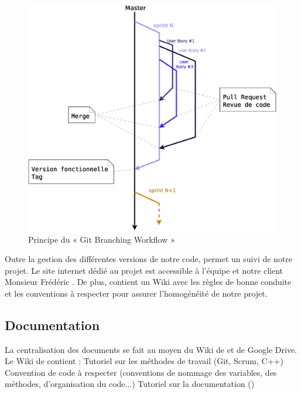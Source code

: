 \begin{figure}[H]
	\centering
	\includegraphics*[width=12cm]{screens/BranchingWorkflow.eps}
	\caption{Principe du « Git Branching Workflow »}
\end{figure}

Outre la gestion des différentes versions de notre code,  permet un suivi de notre projet. Le site internet  dédié au projet est accessible à l’équipe et notre client Monsieur Frédéric . 
De plus,  contient un Wiki avec les règles de bonne conduite et les conventions à respecter pour assurer l’homogénéité de notre projet. 

\subsection{Documentation}
La centralisation des documents se fait au moyen du Wiki de  et de Google Drive. 
Le Wiki de  contient :
Tutoriel sur les méthodes de travail (Git, Scrum, C++)
Convention de code à respecter (conventions de nommage des variables, des méthodes, d’organisation du code...)
Tutoriel sur la documentation ()

